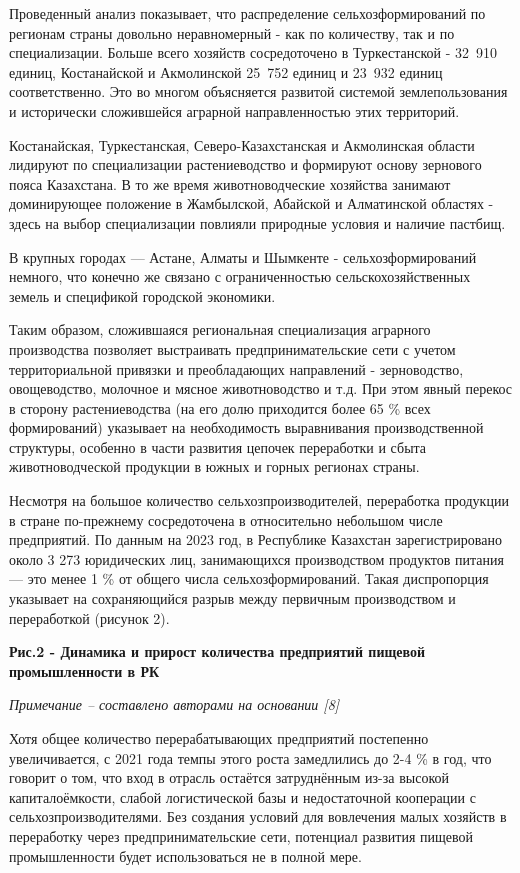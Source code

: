 Проведенный анализ показывает, что распределение сельхозформирований по
регионам страны довольно неравномерный - как по количеству, так и по
специализации. Больше всего хозяйств сосредоточено в Туркестанской -
32~910 единиц, Костанайской и Акмолинской 25~752 единиц и 23~932 единиц
соответственно. Это во многом объясняется развитой системой
землепользования и исторически сложившейся аграрной направленностью этих
территорий.

Костанайская, Туркестанская, Северо-Казахстанская и Акмолинская области
лидируют по специализации растениеводство и формируют основу зернового
пояса Казахстана. В то же время животноводческие хозяйства занимают
доминирующее положение в Жамбылской, Абайской и Алматинской областях -
здесь на выбор специализации повлияли природные условия и наличие
пастбищ.

В крупных городах --- Астане, Алматы и Шымкенте - сельхозформирований
немного, что конечно же связано с ограниченностью сельскохозяйственных
земель и спецификой городской экономики.

Таким образом, сложившаяся региональная специализация аграрного
производства позволяет выстраивать предпринимательские сети с учетом
территориальной привязки и преобладающих направлений - зерноводство,
овощеводство, молочное и мясное животноводство и т.д. При этом явный
перекос в сторону растениеводства (на его долю приходится более 65 \%
всех формирований) указывает на необходимость выравнивания
производственной структуры, особенно в части развития цепочек
переработки и сбыта животноводческой продукции в южных и горных регионах
страны.

Несмотря на большое количество сельхозпроизводителей, переработка
продукции в стране по-прежнему сосредоточена в относительно небольшом
числе предприятий. По данным на 2023 год, в Республике Казахстан
зарегистрировано около 3 273 юридических лиц, занимающихся производством
продуктов питания --- это менее 1 \% от общего числа
сельхозформирований. Такая диспропорция указывает на сохраняющийся
разрыв между первичным производством и переработкой (рисунок 2).

{\bfseries Рис.2 - Динамика и прирост количества предприятий пищевой
промышленности в РК}

\emph{Примечание -- составлено авторами на основании {[}8{]}}

Хотя общее количество перерабатывающих предприятий постепенно
увеличивается, с 2021 года темпы этого роста замедлились до 2-4 \% в
год, что говорит о том, что вход в отрасль остаётся затруднённым из-за
высокой капиталоёмкости, слабой логистической базы и недостаточной
кооперации с сельхозпроизводителями. Без создания условий для вовлечения
малых хозяйств в переработку через предпринимательские сети, потенциал
развития пищевой промышленности будет использоваться не в полной мере.

